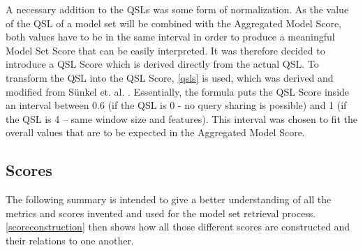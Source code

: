 A necessary addition to the QSLs was some form of normalization. As the value of the QSL of a model set will be combined with the Aggregated Model Score, both values have to be in the same interval in order to produce a meaningful Model Set Score that can be easily interpreted. It was therefore decided to introduce a QSL Score which is derived directly from the actual QSL. To transform the QSL into the QSL Score, \autoref{qsls} is used, which was derived and modified from Sünkel et. al. \cite{sunkel2022}. Essentially, the formula puts the QSL Score inside an interval between 0.6 (if the QSL is 0 - no query sharing is possible) and 1 (if the QSL is 4 – same window size and features). This interval was chosen to fit the overall values that are to be expected in the Aggregated Model Score. 

\subsection{Scores}\label{sec:scores}

The following summary is intended to give a better understanding of all the metrics and scores invented and used for the model set retrieval process. \autoref{scoreconstruction} then shows how all those different scores are constructed and their relations to one another.

